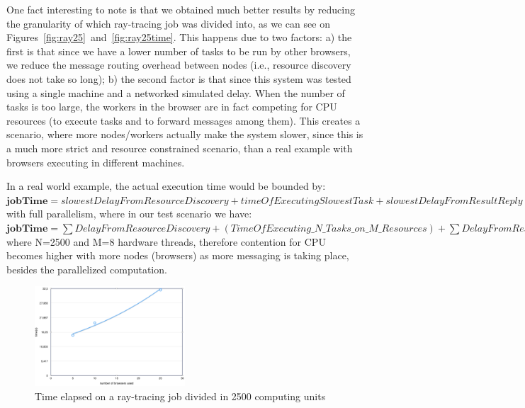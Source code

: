 One fact interesting to note is that we obtained much better results by reducing the granularity of which ray-tracing job was divided into, as we can see on Figures~\ref{fig:ray25}~and~\ref{fig:ray25time}. This happens due to two factors: a) the first is that since we have a lower number of tasks to be run by other browsers, we reduce the message routing overhead between nodes (i.e., resource discovery does not take so long); b) the second factor is that since this system was tested using a single machine and a networked simulated delay. When the number of tasks is too large, the workers in the browser are in fact competing for CPU resources (to execute tasks and to forward messages among them). This creates a scenario, where more nodes/workers actually  make the system slower, since this is a much more strict and resource constrained scenario, than a real example with browsers executing in different machines.

In a real world example, the actual execution time would be bounded by:\\

$\textbf{jobTime}=slowestDelayFromResourceDiscovery+timeOfExecutingSlowestTask+slowestDelayFromResultReply (1)$ \\

with full parallelism, where in our test scenario we have: \\

$\textbf{jobTime}=\sum{DelayFromResourceDiscovery}+(TimeOfExecuting\_N\_Tasks\_on\_M\_Resources)+\sum{DelayFromResultReply} (2)$\\

where N=2500 and M=8 hardware threads, therefore contention for CPU becomes higher with more nodes (browsers) as more messaging is taking place, besides the parallelized computation.

\begin{figure}[]
  \centering
  \includegraphics[width=0.5\textwidth]{figs/1.png}
  \caption{Time elapsed on a ray-tracing job divided in 2500 computing units}
  \label{fig:ray2500}
\end{figure}

